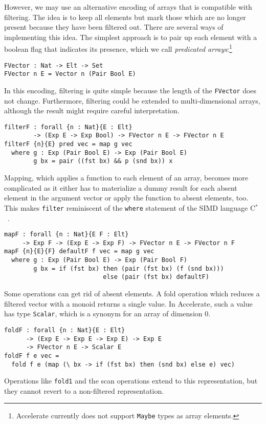 \documentclass{llncs}
\begin{document}
However, we may use an alternative encoding of arrays that is compatible with filtering. The idea
is to keep all elements but mark those which are no longer
present because they have been filtered out.
There are several ways of implementing this idea. The simplest
approach is to pair up each element with a boolean flag that indicates
its presence, which we call \emph{predicated arrays}:\footnote{Accelerate currently does not support
\texttt{Maybe} types as array elements.}
%
\begin{verbatim}
FVector : Nat -> Elt -> Set
FVector n E = Vector n (Pair Bool E)
\end{verbatim}
%
In this encoding, filtering is quite simple because the length of
the \texttt{FVector} does not change. Furthermore, filtering could be
extended to multi-dimensional arrays, although the result might
require careful interpretation.
\begin{verbatim}
filterF : forall {n : Nat}{E : Elt}
        -> (Exp E -> Exp Bool) -> FVector n E -> FVector n E
filterF {n}{E} pred vec = map g vec
  where g : Exp (Pair Bool E) -> Exp (Pair Bool E)
        g bx = pair ((fst bx) && p (snd bx)) x
\end{verbatim}
Mapping, which applies a function to each element of an
array, becomes more complicated as it either has to 
materialize a dummy result for each absent element in the argument
vector or apply the function to absent elements, too. This makes \texttt{filter} reminiscent of the \texttt{where} statement of the SIMD language C$^*$~\cite{rose-etal:c-star}.
\begin{verbatim}
mapF : forall {n : Nat}{E F : Elt}
     -> Exp F -> (Exp E -> Exp F) -> FVector n E -> FVector n F
mapF {n}{E}{F} defaultF f vec = map g vec
  where g : Exp (Pair Bool E) -> Exp (Pair Bool F)
        g bx = if (fst bx) then (pair (fst bx) (f (snd bx)))
                           else (pair (fst bx) defaultF)
\end{verbatim}
Some operations can get rid of absent
elements. A fold operation which reduces a filtered
vector with a monoid returns a single value. In Accelerate, such a value has type
\texttt{Scalar}, which is a synonym for an array of dimension $0$.
\begin{verbatim}
foldF : forall {n : Nat}{E : Elt}
      -> (Exp E -> Exp E -> Exp E) -> Exp E
      -> FVector n E -> Scalar E
foldF f e vec =
  fold f e (map (\ bx -> if (fst bx) then (snd bx) else e) vec)
\end{verbatim}
Operations like \texttt{fold1} and the scan operations
extend to this representation, but they
cannot revert to a
non-filtered representation. 
\end{document}
